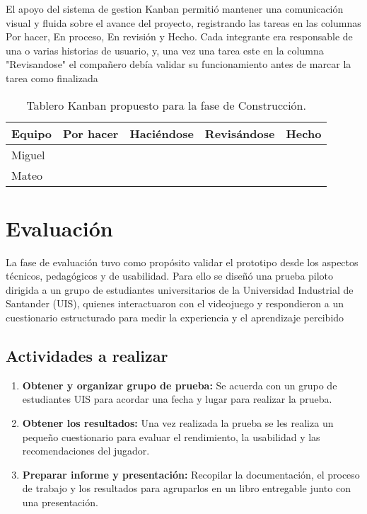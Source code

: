 El apoyo del sistema de gestion Kanban permitió mantener una comunicación visual y fluida sobre el avance del proyecto, registrando las tareas en las columnas Por hacer, En proceso, En revisión y Hecho. Cada integrante era responsable de una o varias historias de usuario, y, una vez una tarea este en la columna "Revisandose" el compañero debía validar su funcionamiento antes de marcar la tarea como finalizada

\begin{table}[H]\centering
\caption{Tablero Kanban propuesto para la fase de Construcción.}
\label{tab:kanban-construccion}
\begin{tabular}{@{}lcccc@{}}
\toprule
\textbf{Equipo} & \textbf{Por hacer} & \textbf{Haciéndose} & \textbf{Revisándose} & \textbf{Hecho} \\
\midrule
Miguel & & & & \\
Mateo  & & & & \\
\bottomrule
\end{tabular}
\end{table}

\section{Evaluación}

La fase de evaluación tuvo como propósito validar el prototipo desde los aspectos técnicos, pedagógicos y de usabilidad. Para ello se diseñó una prueba piloto dirigida a un grupo de estudiantes universitarios de la Universidad Industrial de Santander (UIS), quienes interactuaron con el videojuego y respondieron a un cuestionario estructurado para medir la experiencia y el aprendizaje percibido

\subsection{Actividades a realizar}

\begin{enumerate}
  \item \textbf{Obtener y organizar grupo de prueba:} Se acuerda con un grupo de estudiantes UIS para acordar una fecha y lugar para realizar la prueba.
  \item \textbf{Obtener los resultados:} Una vez realizada la prueba se les realiza un pequeño cuestionario para evaluar el rendimiento, la usabilidad y las recomendaciones del jugador.
  \item \textbf{Preparar informe y presentación:} Recopilar la documentación, el proceso de trabajo y los resultados para agruparlos en un libro entregable junto con una presentación.
\end{enumerate}
